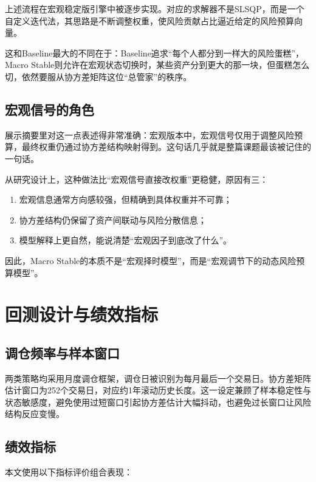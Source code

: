 \documentclass[12pt,a4paper]{ctexart}
\begin{document}
上述流程在宏观稳定版引擎中被逐步实现。对应的求解器不是SLSQP，而是一个自定义迭代法，其思路是不断调整权重，使风险贡献占比逼近给定的风险预算向量。

这和Baseline最大的不同在于：Baseline追求“每个人都分到一样大的风险蛋糕”，Macro Stable则允许在宏观状态切换时，某些资产分到更大的那一块，但蛋糕怎么切，依然要服从协方差矩阵这位“总管家”的秩序。

\subsection{宏观信号的角色}

展示摘要里对这一点表述得非常准确：宏观版本中，宏观信号仅用于调整风险预算，最终权重仍通过协方差结构映射得到。这句话几乎就是整篇课题最该被记住的一句话。

从研究设计上，这种做法比“宏观信号直接改权重”更稳健，原因有三：

\begin{enumerate}[label=\arabic*)]
    \item 宏观信息通常方向感较强，但精确到具体权重并不可靠；
    \item 协方差结构仍保留了资产间联动与风险分散信息；
    \item 模型解释上更自然，能说清楚“宏观因子到底改了什么”。
\end{enumerate}

因此，Macro Stable的本质不是“宏观择时模型”，而是“宏观调节下的动态风险预算模型”。

\section{回测设计与绩效指标}

\subsection{调仓频率与样本窗口}

两类策略均采用月度调仓框架，调仓日被识别为每月最后一个交易日。协方差矩阵估计窗口为252个交易日，对应约1年滚动历史长度。这一设定兼顾了样本稳定性与状态敏感度，避免使用过短窗口引起协方差估计大幅抖动，也避免过长窗口让风险结构反应变慢。

\subsection{绩效指标}

本文使用以下指标评价组合表现：
\end{document}
